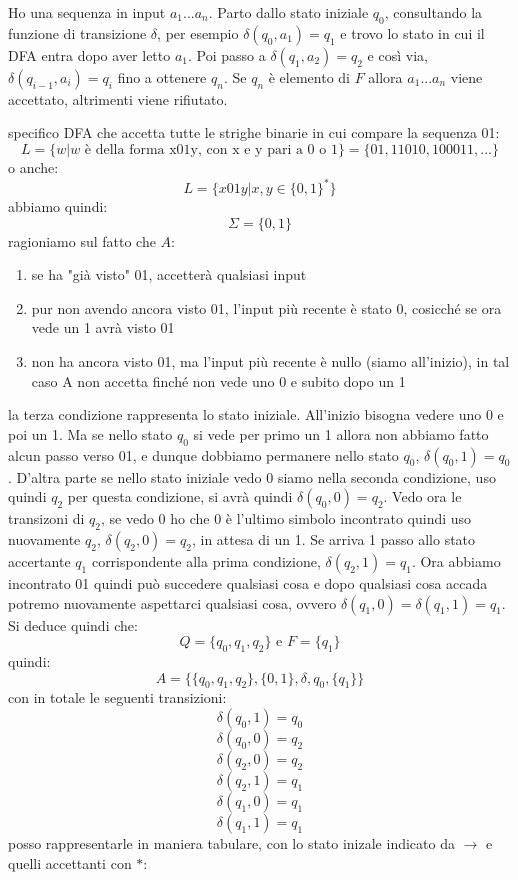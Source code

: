 Ho una sequenza in input $a_1...a_n$. Parto dallo stato iniziale $q_0$, consultando la funzione di transizione $\delta$, per esempio  $\delta(q_0,a_1)=q_1$ e trovo lo stato in cui il DFA entra dopo aver letto $a_1$. Poi passo a $\delta(q_1,a_2)=q_2$ e così via, $\delta(q_{i-1},a_i)=q_i$ fino a ottenere $q_n$. Se $q_n$ è elemento di $F$ allora $a_1...a_n$ viene accettato, altrimenti viene rifiutato.
\begin{esempio}
	specifico DFA che accetta tutte le strighe binarie in cui compare la sequenza 01:
	$$L=\{w|w \mbox{ è della forma x01y, con x e y pari a 0 o 1} \}=\{01,11010,100011,...\}$$
	o anche:
	$$L=\{x01y| x,y\in\{0,1\}^* \}$$
	abbiamo quindi:
	$$\Sigma=\{0,1\}$$
	ragioniamo sul fatto che $A$:
	\begin{enumerate}
		\item se ha "già visto" 01, accetterà qualsiasi input
		\item pur non avendo ancora visto 01, l'input più recente è stato 0, cosicché se ora vede un 1 avrà visto 01
		\item non ha ancora visto 01, ma l'input più recente è nullo (siamo all'inizio), in tal caso A non accetta finché non vede
		      uno 0 e subito dopo un 1
	\end{enumerate}
	la terza condizione rappresenta lo stato iniziale. All'inizio bisogna vedere uno 0 e poi un 1. Ma se nello stato $q_0$ si vede per primo un 1 allora non abbiamo fatto alcun passo verso 01, e dunque dobbiamo permanere nello stato $q_0$, $\delta(q_0,1)=q_0$. D'altra parte se nello stato iniziale vedo 0 siamo nella seconda condizione, uso quindi $q_2$ per questa condizione, si avrà quindi $\delta(q_0,0)=q_2$. Vedo ora le transizoni di $q_2$, se vedo 0 ho che 0 è l'ultimo simbolo incontrato quindi uso nuovamente $q_2$, $\delta(q_2,0)=q_2$, in attesa di un 1. Se arriva 1 passo allo stato accertante $q_1$ corrispondente alla prima condizione, $\delta(q_2,1)=q_1$. Ora abbiamo incontrato 01 quindi può succedere qualsiasi cosa e dopo qualsiasi cosa accada potremo nuovamente aspettarci qualsiasi cosa, ovvero $\delta(q_1,0)=\delta(q_1,1)=q_1$. Si deduce quindi che:
	$$Q=\{q_0,q_1,q_2\} \mbox{ e } F=\{q_1\}$$
	quindi:
	$$A=\{\{q_0,q_1,q_2\} ,\{0,1\}, \delta, q_0, \{q_1\} \}$$
	con in totale le seguenti transizioni:
	$$\delta(q_0,1)=q_0$$
	$$\delta(q_0,0)=q_2$$
	$$\delta(q_2,0)=q_2$$
	$$\delta(q_2,1)=q_1$$
	$$\delta(q_1,0)=q_1$$
	$$\delta(q_1,1)=q_1$$
	posso rappresentarle in maniera tabulare, con lo stato inizale indicato da $\to$ e quelli accettanti con $*$:
	\begin{center}

\end{center}
\end{esempio}
